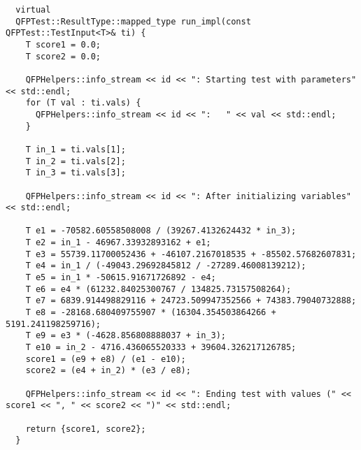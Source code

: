 \documentclass{article}
\begin{document}
\begin{verbatim}
  virtual
  QFPTest::ResultType::mapped_type run_impl(const QFPTest::TestInput<T>& ti) {
    T score1 = 0.0;
    T score2 = 0.0;

    QFPHelpers::info_stream << id << ": Starting test with parameters" << std::endl;
    for (T val : ti.vals) {
      QFPHelpers::info_stream << id << ":   " << val << std::endl;
    }

    T in_1 = ti.vals[1];
    T in_2 = ti.vals[2];
    T in_3 = ti.vals[3];

    QFPHelpers::info_stream << id << ": After initializing variables" << std::endl;

    T e1 = -70582.60558508008 / (39267.4132624432 * in_3);
    T e2 = in_1 - 46967.33932893162 + e1;
    T e3 = 55739.11700052436 + -46107.2167018535 + -85502.57682607831;
    T e4 = in_1 / (-49043.29692845812 / -27289.46008139212);
    T e5 = in_1 * -50615.91671726892 - e4;
    T e6 = e4 * (61232.84025300767 / 134825.73157508264);
    T e7 = 6839.914498829116 + 24723.509947352566 + 74383.79040732888;
    T e8 = -28168.680409755907 * (16304.354503864266 + 5191.241198259716);
    T e9 = e3 * (-4628.856808888037 + in_3);
    T e10 = in_2 - 4716.436065520333 + 39604.326217126785;
    score1 = (e9 + e8) / (e1 - e10);
    score2 = (e4 + in_2) * (e3 / e8);

    QFPHelpers::info_stream << id << ": Ending test with values (" << score1 << ", " << score2 << ")" << std::endl;

    return {score1, score2};
  }
\end{verbatim}
\end{document}
